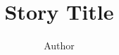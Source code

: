 \documentclass[ebook,11pt,oneside,openany]{memoir}
\begin{document}
\title{Story Title}
\author{Author}
\date{}
\maketitle

\section*{}

\end{document}
